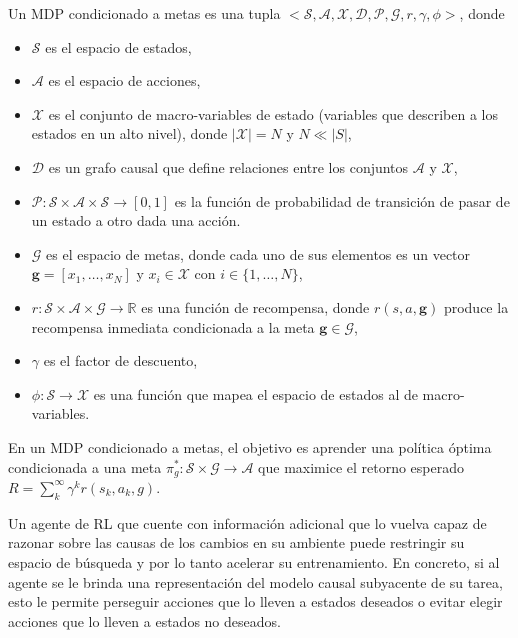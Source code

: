     Un MDP condicionado a metas es
una tupla $<\mathcal{S}, \mathcal{A}, \mathcal{X},
\mathcal{D}, \mathcal{P}, \mathcal{G}, r, \gamma, \phi>$, donde 
\begin{itemize}
    \item $\mathcal{S}$ es el espacio de estados, 
    \item $\mathcal{A}$ es el espacio de acciones, 
    \item $\mathcal{X}$ es el conjunto de
    macro-variables de estado \cite{chalupka2014visual} (variables 
    que describen a los estados en un alto nivel), donde $|\mathcal{X}| = N$ y
    $N \ll |S|$, 
    \item $\mathcal{D}$ es un grafo causal
    que define relaciones entre
    los conjuntos $\mathcal{A}$ y $\mathcal{X}$, 
    \item $\mathcal{P}: \mathcal{S} \times \mathcal{A} \times \mathcal{S} \rightarrow [0, 1]
     $ es la función de probabilidad de transición de pasar de un estado a otro dada una acción. 
    \item $\mathcal{G}$ es el espacio de metas, donde cada uno de sus elementos es un vector $\mathbf{g} = [x_1, \dots, x_N]$ y $x_i \in \mathcal{X}$
    con $i \in \{1, \dots, N\}$,
    \item $r : \mathcal{S} \times \mathcal{A} \times \mathcal{G} \rightarrow \mathbb{R}$ es una función
de recompensa, donde $r(s, a, \mathbf{g})$ produce la recompensa inmediata condicionada a la meta $\mathbf{g} \in \mathcal{G}$,
\item $\gamma$ es el factor de descuento,
\item $\phi : \mathcal{S} \rightarrow \mathcal{X}$ es una función que mapea el espacio de estados al de macro-variables.
\end{itemize}

En un MDP condicionado a metas, el objetivo es aprender una 
política óptima condicionada a una meta $\pi^*_g: \mathcal{S} \times \mathcal{G} \rightarrow \mathcal{A}$ que maximice el retorno esperado $R = \sum_{k}^{\infty}\gamma^{k} r(s_k, a_k, g)$.

Un agente de RL que cuente con información adicional que lo vuelva 
capaz de razonar sobre las causas de los cambios en su ambiente 
puede restringir su espacio de búsqueda y
por lo tanto acelerar su entrenamiento.
En concreto, si al agente se le brinda una representación del modelo
causal subyacente de su tarea, esto le permite perseguir acciones que lo lleven a
estados deseados o evitar elegir acciones que lo lleven a 
estados no deseados.

